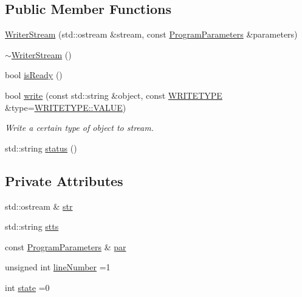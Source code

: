 \subsection*{Public Member Functions}
\begin{DoxyCompactItemize}
\item 
\hyperlink{classWriterStream_a55d7efb73214dc0e537b7f2960920571}{Writer\+Stream} (std\+::ostream \&stream, const \hyperlink{structProgramParameters}{Program\+Parameters} \&parameters)
\item 
\hyperlink{classWriterStream_aca4ddce14ac1b23a2f5db8cce0af4cfd}{$\sim$\+Writer\+Stream} ()
\item 
bool \hyperlink{classWriterStream_a32e6913d45c7e67e60c0787c7a3e9467}{is\+Ready} ()
\item 
bool \hyperlink{classWriterStream_aae19a7c01c19fe723a7a3223a53550c0}{write} (const std\+::string \&object, const \hyperlink{classWriterInterface_af35706b761b016972144a9333637d93d}{W\+R\+I\+T\+E\+T\+Y\+PE} \&type=\hyperlink{classWriterInterface_af35706b761b016972144a9333637d93daecc2e9c313faddb07e7da223c1dc5c3f}{W\+R\+I\+T\+E\+T\+Y\+P\+E\+::\+V\+A\+L\+UE})
\begin{DoxyCompactList}\small\item\em Write a certain type of object to stream. \end{DoxyCompactList}\item 
std\+::string \hyperlink{classWriterStream_ac5da94332707b311cb43b06c9356afce}{status} ()
\end{DoxyCompactItemize}
\subsection*{Private Attributes}
\begin{DoxyCompactItemize}
\item 
std\+::ostream \& \hyperlink{classWriterStream_ac2546b4b790c718a1904e5e5163cabb6}{str}
\item 
std\+::string \hyperlink{classWriterStream_abc306418fe983c47cc843316f737df00}{stts}
\item 
const \hyperlink{structProgramParameters}{Program\+Parameters} \& \hyperlink{classWriterStream_ae5f1b2651b7d7a6376cfa849f973c484}{par}
\item 
unsigned int \hyperlink{classWriterStream_a513c49b4983a63adf95256219b015fee}{line\+Number} =1
\item 
int \hyperlink{classWriterStream_a1e6370b32d8e15098300567b38580399}{state} =0
\end{DoxyCompactItemize}
